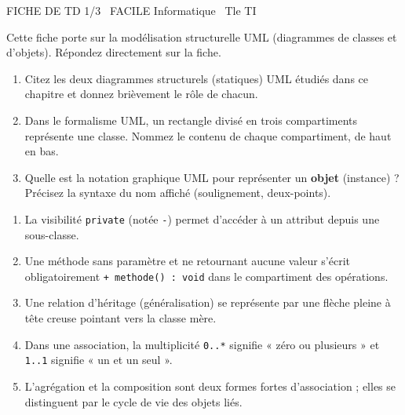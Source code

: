 \documentclass[11pt]{article}
\begin{document}
\begin{tcolorbox}[enhanced,colback=popink,colframe=popink,arc=10pt,boxrule=0pt,left=12pt,right=12pt,top=9pt,bottom=9pt]
{\color{white}\popxbold\small FICHE DE TD 1/3 \textbullet\ FACILE \hfill Informatique \textbullet\ Tle TI\par}
\end{tcolorbox}
\vspace{4pt}
Cette fiche porte sur la modélisation structurelle UML (diagrammes de classes et d'objets). Répondez directement sur la fiche.

\begin{exercice}
\begin{enumerate}
    \item Citez les deux diagrammes structurels (statiques) UML étudiés dans ce chapitre et donnez brièvement le rôle de chacun.
    \item Dans le formalisme UML, un rectangle divisé en trois compartiments représente une classe. Nommez le contenu de chaque compartiment, de haut en bas.
    \item Quelle est la notation graphique UML pour représenter un \textbf{objet} (instance) ? Précisez la syntaxe du nom affiché (soulignement, deux-points).
\end{enumerate}
\end{exercice}

\begin{exercice}
\begin{enumerate}
    \item La visibilité \texttt{private} (notée \texttt{-}) permet d'accéder à un attribut depuis une sous-classe.
    \item Une méthode sans paramètre et ne retournant aucune valeur s'écrit obligatoirement \texttt{+ methode() : void} dans le compartiment des opérations.
    \item Une relation d'héritage (généralisation) se représente par une flèche pleine à tête creuse pointant vers la classe mère.
    \item Dans une association, la multiplicité \texttt{0..*} signifie « zéro ou plusieurs » et \texttt{1..1} signifie « un et un seul ».
    \item L'agrégation et la composition sont deux formes fortes d'association ; elles se distinguent par le cycle de vie des objets liés.
\end{enumerate}
\end{exercice}
\end{document}
